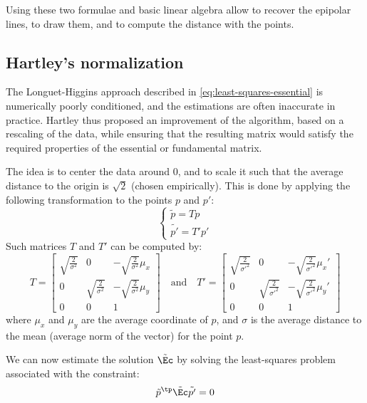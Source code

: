 Using these two formulae and basic linear algebra allow to recover the epipolar lines, to draw them, and to compute the distance with the points.

\subsection{Hartley's normalization}
The Longuet-Higgins approach described in \autoref{eq:least-squares-essential} is numerically poorly conditioned, and the estimations are often inaccurate in practice. Hartley thus proposed an improvement of the algorithm, based on a rescaling of the data, while ensuring that the resulting matrix would satisfy the required properties of the essential or fundamental matrix.

The idea is to center the data around 0, and to scale it such that the average distance to the origin is $\sqrt{2}$ (chosen empirically). This is done by applying the following transformation to the points $p$ and $p'$:
\begin{equation*}
    \begin{cases}
        \tilde{p} = Tp\\
        \tilde{p'} = T'p'
    \end{cases}
\end{equation*}
Such matrices $T$ and $T'$ can be computed by:
\begin{equation*}
    T = \begin{bmatrix}
        \sqrt{\frac{2}{\sigma^2}} & 0 & -\sqrt{\frac{2}{\sigma^2}}\mu_x \\
        0 & \sqrt{\frac{2}{\sigma^2}} & -\sqrt{\frac{2}{\sigma^2}}\mu_y \\
        0 & 0 & 1
    \end{bmatrix}
    \quad\text{and}\quad
    T' = \begin{bmatrix}
        \sqrt{\frac{2}{\sigma'^2}} & 0 & -\sqrt{\frac{2}{\sigma'^2}}\mu_x' \\
        0 & \sqrt{\frac{2}{\sigma'^2}} & -\sqrt{\frac{2}{\sigma'^2}}\mu_y' \\
        0 & 0 & 1
    \end{bmatrix}
\end{equation*}
where $\mu_x$ and $\mu_y$ are the average coordinate of $p$, and $\sigma$ is the average distance to the mean (average norm of the vector) for the point $p$.

We can now estimate the solution $\tilde{\Ec}$ by solving the least-squares problem associated with the constraint:
\begin{equation}
    \label{eq:normalized-essential}
    \tilde{p}^\tp\tilde{\Ec}\tilde{p'}=0
\end{equation}

